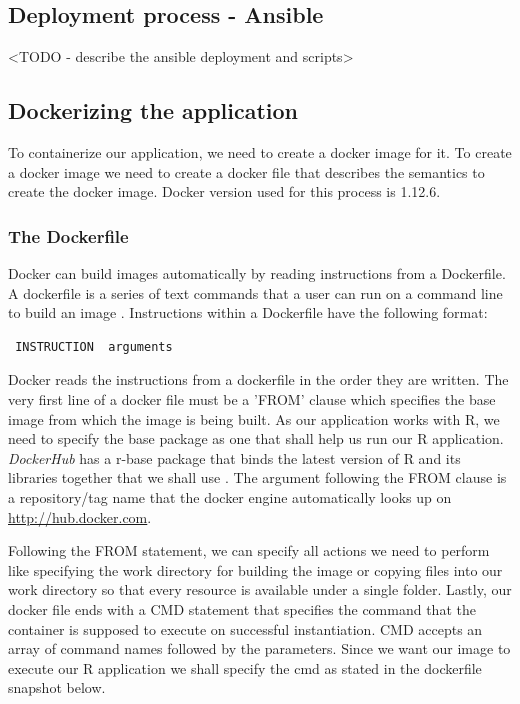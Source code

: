 \documentclass[9pt,twocolumn,twoside]{../../styles/osajnl}
\begin{document}
\subsection{Deployment process - Ansible}
<TODO - describe the ansible deployment and scripts>

\subsection{Dockerizing the application}
To containerize our application, we need to create a docker image for
it. To create a docker image we need to create a docker file that
describes the semantics to create the docker image. Docker version
used for this process is 1.12.6.

\subsubsection{The Dockerfile}
Docker can build images automatically by reading instructions from a
Dockerfile. A dockerfile is a series of text commands that a user can
run on a command line to build an image \cite{www-dockerfile-documentation}.
\newline
Instructions within a Dockerfile have the following format:

\begin{verbatim}
 INSTRUCTION  arguments
\end{verbatim}

Docker reads the instructions from a dockerfile in the order they are
written. The very first line of a docker file must be a 'FROM' clause
which specifies the base image from which the image is being built. As
our application works with R, we need to specify the base package as
one that shall help us run our R application. \emph{DockerHub} has a
r-base package that binds the latest version of R and its libraries
together that we shall use \cite{www-rbase-docker}.  The argument
following the FROM clause is a repository/tag name that the docker
engine automatically looks up on \url{http://hub.docker.com}.

Following the FROM statement, we can specify all actions we need to
perform like specifying the work directory for building the image or
copying files into our work directory so that every resource is
available under a single folder. Lastly, our docker file ends with a
CMD statement that specifies the command that the container is
supposed to execute on successful instantiation. CMD accepts an array
of command names followed by the parameters. Since we want our image
to execute our R application we shall specify the cmd as stated in the
dockerfile snapshot below.
\end{document}
